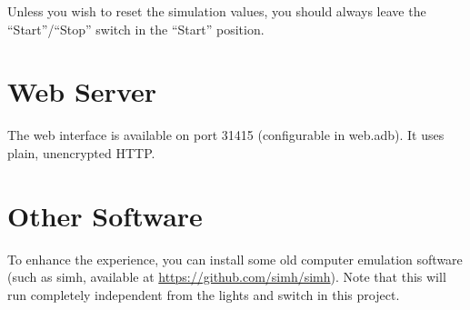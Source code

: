 \documentclass[10pt, openany]{book}
\newcommand{\switch}[2]{``#1''/``#2''}
\newcommand{\position}[1]{``#1''}
\begin{document}
Unless you wish to reset the simulation values, you should always leave the \switch{Start}{Stop} switch in the \position{Start} position.

\section{Web Server}
The web interface is available on port 31415 (configurable in web.adb).  It uses plain, unencrypted HTTP.

\section{Other Software}
To enhance the experience, you can install some old computer emulation software (such as simh, available at \url{https://github.com/simh/simh}).  Note that this will run completely independent from the lights and switch in this project.
\end{document}
